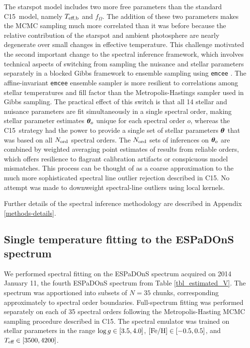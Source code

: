 \documentclass[twocolumn]{emulateapj}%
\newcommand{\iancze}{{\sc C15}}
\begin{document}
The starspot model includes two more free parameters than the standard \iancze\ model, namely $T_\textrm{eff,b}$ and $f_{\Omega}$.  The addition of these two parameters makes the MCMC sampling much more correlated than it was before because the relative contribution of the starspot and ambient photosphere are nearly degenerate over small changes in effective temperature.  This challenge motivated the second important change to the spectral inference framework, which involves technical aspects of switching from sampling the nuisance and stellar parameters separately in a blocked Gibbs framework to ensemble sampling using \texttt{emcee} \citep{foreman13}.  The affine-invariant \texttt{emcee} ensemble sampler is more resilient to correlations among stellar temperatures and fill factor than the Metropolis-Hastings sampler used in Gibbs sampling.  The practical effect of this switch is that all 14 stellar and nuisance parameters are fit simultaneously in a single spectral order, making stellar parameter estimates ${\bm \theta}_{o}$ unique for each spectral order $o$, whereas the \iancze\ strategy had the power to provide a single set of stellar parameters ${\bm \theta}$ that was based on all $N_{\rm ord}$ spectral orders.  The $N_{\rm ord}$ sets of inferences on ${\bm \theta}_{o}$ are combined by weighted averaging point estimates of results from reliable orders, which offers resilience to flagrant calibration artifacts or conspicuous model mismatches.  This process can be thought of as a coarse approximation to the much more sophisticated spectral line outlier rejection described in \iancze.  No attempt was made to downweight spectral-line outliers using local kernels.

Further details of the spectral inference methodology are described in Appendix \ref{methods-details}.


\subsection{Single temperature fitting to the ESPaDOnS spectrum}\label{sec:ESP_starfish}

We performed spectral fitting on the ESPaDOnS spectrum acquired on 2014 January 11, the fourth ESPaDOnS spectrum from Table \ref{tbl_estimated_V}.  The spectrum was apportioned into subsets of $N=35$ chunks, corresponding approximately to spectral order boundaries.  Full-spectrum fitting was performed separately on each of 35 spectral orders following the Metropolis-Hasting MCMC sampling procedure described in \iancze.  The spectral emulator was trained on stellar parameters in the range $\log g \in [3.5, 4.0]$, $[{\rm Fe}/{\rm H}] \in [-0.5, 0.5]$, and $T_\textrm{eff} \in [3500, 4200]$.
\end{document}
